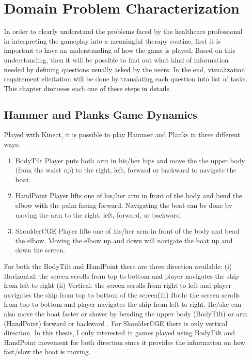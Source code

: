 \chapter{Domain Problem Characterization}
\label{chap:back}

In order to clearly understand the problems faced by the healthcare professional in interpreting the gameplay into a meaningful therapy routine, first it is important to have an understanding of how the game is played. Based on this understanding, then it will be possible to find out what kind of information needed by defining questions usually asked by the users. In the end, visualization requirement elicitation will be done by translating each question into list of tasks. This chapter discusses each one of these steps in details.

\section{Hammer and Planks Game Dynamics}

Played with Kinect, it is possible to play Hammer and Planks in three different ways:
\begin{enumerate}
  \item BodyTilt
  Player puts both arm in his/her hips and move the the upper body (from the waist up) to the right, left, forward or backward to navigate the boat. 
  \item HandPoint
  Player lifts one of his/her arm in front of the body and bend the elbow with the palm facing forward. Navigating the boat can be done by moving the arm to the right, left, forward, or backward.
  \item ShoulderCGE
  Player lifts one of his/her arm in front of the body and bend the elbow. Moving the elbow up and down will navigate the boat up and down the screen.
\end{enumerate}

For both the BodyTilt and HandPoint there are three direction available: (i) Horizontal: the screen scrolls from top to bottom and player navigates the ship from left to right (ii) Vertical: the screen scrolls from right to left and player navigates the ship from top to bottom of the screen(iii) Both: the screen scrolls from top to bottom and player navigates the ship from left to right. He/she can also move the boat faster or slower by bending the upper body (BodyTilt) or arm (HandPoint) forward or backward . For ShoulderCGE there is only vertical direction. In this thesis, I only interested in games played using BodyTilt and HandPoint movement for both direction since it provides the information on how fast/slow the boat is moving.

